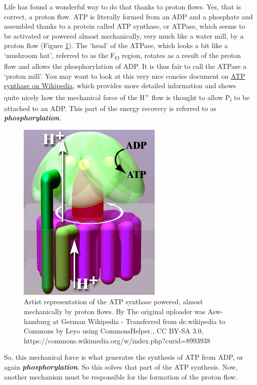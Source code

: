 \documentclass[]{book}
\theoremstyle{definition}
\theoremstyle{definition}
\theoremstyle{definition}
\theoremstyle{remark}
\begin{document}
Life has found a wonderful way to do that thanks to proton flows. Yes,
that is correct, a proton flow. ATP is literally formed from an ADP and
a phosphate and assembled thanks to a protein called ATP synthase, or
ATPase, which seems to be activated or powered almost mechanically, very
much like a water mill, by a proton flow (Figure \ref{fig:ATPase}). The
`head' of the ATPase, which looks a bit like a `mushroom hat', referred
to as the F\textsubscript{O} region, rotates as a result of the proton
flow and allows the phosphorylation of ADP. It is thus fair to call the
ATPase a `proton mill'. You may want to look at this very nice concise
document on \href{https://en.wikipedia.org/wiki/ATP_synthase}{ATP
synthase on Wikipedia}, which provides more detailed information and
shows quite nicely how the mechanical force of the H\textsuperscript{+}
flow is thought to allow P\textsubscript{i} to be attached to an ADP.
This part of the energy recovery is referred to as
\emph{\textbf{phosphorylation}}.

\begin{figure}

{\centering \includegraphics[width=0.4\linewidth]{pictures/Atpsyntase4} 

}

\caption{Artist representation of the ATP synthase powered, almost mechanically by proton flows. By The original uploader was Asw-hamburg at German Wikipedia - Transferred from de.wikipedia to Commons by Leyo using CommonsHelper., CC BY-SA 3.0, https://commons.wikimedia.org/w/index.php?curid=8993938}\label{fig:ATPase}
\end{figure}

So, this mechanical force is what generates the synthesis of ATP from
ADP, or again \emph{\textbf{phosphorylation}}. So this solves that part
of the ATP synthesis. Now, another mechanism must be responsible for the
formation of the proton flow.
\end{document}
